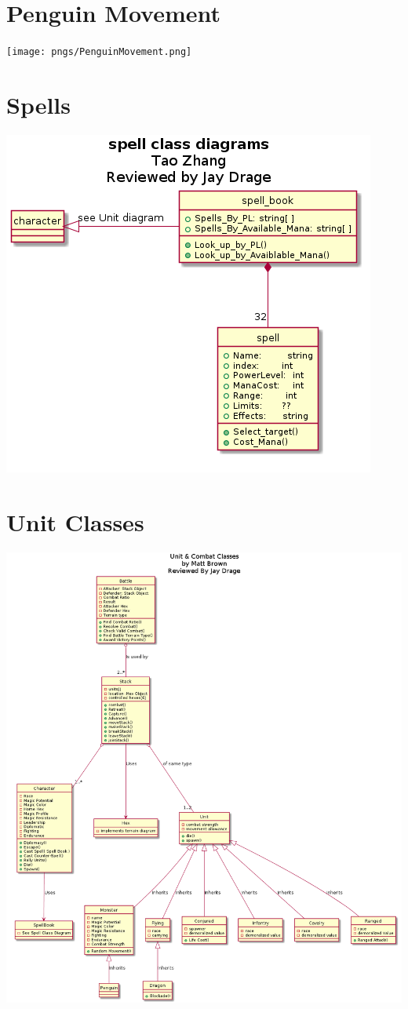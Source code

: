 \documentclass{article}
\begin{document}
\section{Penguin Movement}
\texttt{[image: pngs/PenguinMovement.png]}

\section{Spells}
\includegraphics[width=\textwidth]{pngs/spell.png}

\section{Unit Classes}
\includegraphics[width=\textwidth]{pngs/UnitClasses.png}



\end{document}
